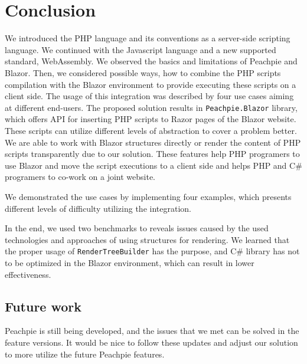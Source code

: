 \chapter*{Conclusion}

We introduced the PHP language and its conventions as a server-side scripting language.
We continued with the Javascript language and a new supported standard, WebAssembly.
We observed the basics and limitations of Peachpie and Blazor.
Then, we considered possible ways, how to combine the PHP scripts compilation with the Blazor environment to provide executing these scripts on a client side.
The usage of this integration was described by four use cases aiming at different end-users.
The proposed solution results in \texttt{Peachpie.Blazor} library, which offers API for inserting PHP scripts to Razor pages of the Blazor website.
These scripts can utilize different levels of abstraction to cover a problem better.
We are able to work with Blazor structures directly or render the content of PHP scripts transparently due to our solution.
These features help PHP programers to use Blazor and move the script executions to a client side and helps PHP and C\# programers to co-work on a joint website.
\par
We demonstrated the use cases by implementing four examples, which presents different levels of difficulty utilizing the integration.
\par
In the end, we used two benchmarks to reveals issues caused by the used technologies and approaches of using structures for rendering.
We learned that the proper usage of \texttt{RenderTreeBuilder} has the purpose, and C\# library has not to be optimized in the Blazor environment, which can result in lower effectiveness.

\section*{Future work}

Peachpie is still being developed, and the issues that we met can be solved in the feature versions.
It would be nice to follow these updates and adjust our solution to more utilize the future Peachpie features.

